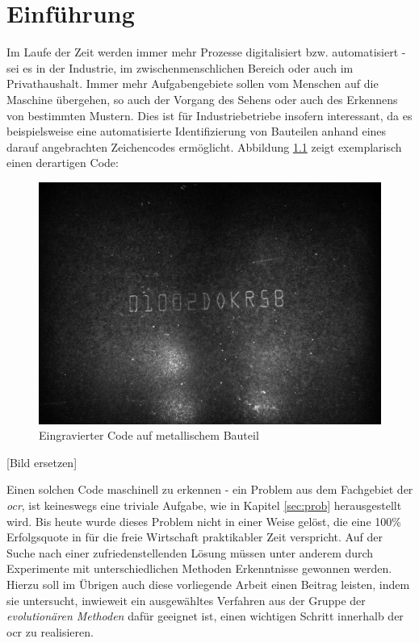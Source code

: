 \chapter{Einführung}
\label{sec:intro}
	
	Im Laufe der Zeit werden immer mehr Prozesse digitalisiert bzw. 
	automatisiert - sei es in der Industrie, im zwischenmenschlichen 
	Bereich oder auch im Privathaushalt. Immer mehr Aufgabengebiete sollen vom 
	Menschen auf die Maschine übergehen, so auch der Vorgang des Sehens oder 
	auch des Erkennens von bestimmten Mustern. Dies ist für Industriebetriebe 
	insofern interessant, da es beispielsweise eine automatisierte 
	Identifizierung von Bauteilen anhand eines darauf angebrachten 
	Zeichencodes ermöglicht. Abbildung \ref{fig:example-code} zeigt 
	exemplarisch einen derartigen Code:
	\begin{figure}[h]
		\centering
		\includegraphics[width=\linewidth]{beispielcode}
		\caption{Eingravierter Code auf metallischem Bauteil}
		\label{fig:example-code}
	\end{figure}
\color{red}[Bild ersetzen] \color{black}

	Einen solchen Code maschinell zu erkennen - ein Problem aus dem Fachgebiet 
	der \textit{\gls{ocr}}, ist keineswegs eine 
	triviale Aufgabe, wie in Kapitel \ref{sec:prob} herausgestellt wird. Bis 
	heute wurde dieses Problem nicht in einer Weise gelöst, die eine 100\% 
	Erfolgsquote in für die freie Wirtschaft praktikabler Zeit verspricht. Auf 
	der Suche nach einer zufriedenstellenden Lösung müssen unter anderem durch 
	Experimente mit unterschiedlichen Methoden Erkenntnisse gewonnen werden. 
	Hierzu soll im Übrigen auch diese vorliegende Arbeit einen Beitrag leisten, 
	indem sie untersucht, inwieweit ein ausgewähltes Verfahren aus der Gruppe 
	der \textit{evolutionären Methoden} dafür geeignet ist, einen wichtigen 
	Schritt innerhalb der \gls{ocr} zu realisieren. \\
	
